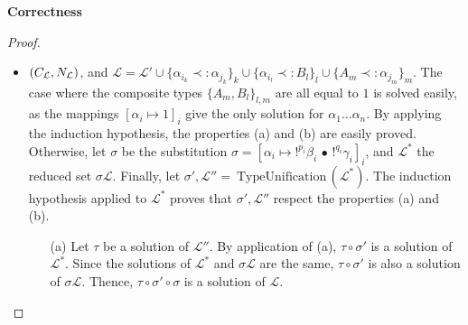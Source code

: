 \begin{thm}{\bf Correctness}
\begin{proof}
\begin{itemize}
\begin{itemize}
						\item[(b)] Let $\rho$ be a solution of $\mathcal{L}$, and therefore of $\lset'$.
							The property (b) applied with $\mathcal{L''}$ and $\sigma$ ensures the existence
							of $\tau$ solution of $\mathcal{L''}$ such that $\tau \circ \sigma$ is equal to $\rho$. Moreover, it follows from (c) that
							$\sigma \{ \alpha_{i_k} \prec: \alpha_{j_k} \}_k = \{\alpha_{i_k} \prec: \alpha_{j_k} \}_k$. Thus,
								$$(\tau \circ \sigma) \{\alpha_{i_k} \prec: \alpha_{j_k} \}_k = \tau \{\alpha_{i_k} \prec: \alpha_{j_k} \}_k$$
							Since $\rho = \tau \circ \sigma$ is a solution of $\{\alpha_{i_k} \prec: \alpha_{j_k} \}_k$, it follows that $\tau$ is a solution of
							$\{\alpha_{i_k} \prec: \alpha_{j_k} \}_k$, and also of $\lset'' \cup \{\alpha_{i_k} \prec: \alpha_{j_k} \}_k$. This completes
							the proof of the property (b).
					\end{itemize}
			
			\item $(C_{\mathcal{L}}, N_{\mathcal{L}})$, and $\mathcal{L} = \mathcal{L'} \cup \{ \alpha_{i_k} \prec: \alpha_{j_k} \}_k \cup
				\{ \alpha_{i_l} \prec: B_l \}_l \cup \{ A_m \prec: \alpha_{j_m} \}_m$.
				The case where the composite types $\{ A_m, B_l \}_{l, m}$ are all equal to $1$ is solved easily, as the mappings
				$[\alpha_i \mapsto 1]_i$ give the only solution for $\alpha_1 \dots \alpha_n$.
				By applying the induction hypothesis, the properties (a) and (b) are easily proved. \\
				
				Otherwise, let $\sigma$ be the substitution $\sigma = [\alpha_i \mapsto !^{p_i}\beta_i \,\bullet\, !^{q_i}\gamma_i]_i$, and
				$\mathcal{L}^*$ the reduced set $\sigma \mathcal{L}$. Finally, let $\sigma', \mathcal{L''} = ~\text{TypeUnification}\,(\mathcal{L}^*)$.
				The induction hypothesis applied to $\mathcal{L}^*$ proves that $\sigma', \mathcal{L''}$ respect the properties (a) and (b).
					\begin{itemize}
						\item[(a)] Let $\tau$ be a solution of $\mathcal{L''}$. By application of (a), $\tau \circ \sigma'$ is a solution of $\mathcal{L}^*$.
							Since the solutions of $\mathcal{L}^*$ and $\sigma \mathcal{L}$ are the same, $\tau \circ \sigma'$ is also a solution of
							$\sigma \mathcal{L}$. Thence, $\tau \circ \sigma' \circ \sigma$ is a solution of $\mathcal{L}$.
							

\end{itemize}
\end{itemize}
\end{proof}
\end{thm}
